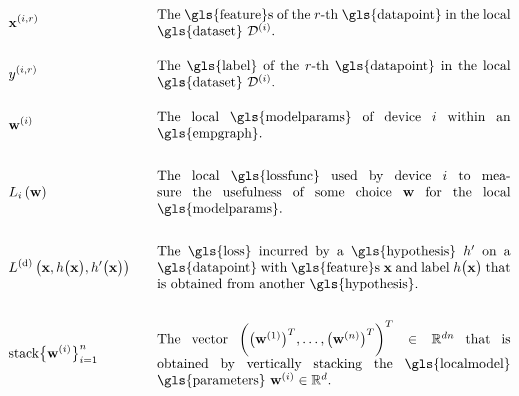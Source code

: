 \begin{align} 
		&\featurevec^{(\nodeidx,\sampleidx)} & \quad & \parbox{.75\textwidth}{The \gls{feature}s of the $\sampleidx$-th \gls{datapoint} in 
		the local \gls{dataset} $\localdataset{\nodeidx}$.}  \nonumber   \\[4mm] 
	&\truelabel^{(\nodeidx,\sampleidx)} & \quad & \parbox{.75\textwidth}{The \gls{label} of the $\sampleidx$-th \gls{datapoint} in 
		the local \gls{dataset} $\localdataset{\nodeidx}$.} \nonumber \\[4mm]
		&\localparams{\nodeidx} & \quad & \parbox{.75\textwidth}{The local \gls{modelparams} of device $\nodeidx$ within an \gls{empgraph}.} \nonumber\\[6mm]
		&\locallossfunc{\nodeidx}{\weights} & \quad & \parbox{.75\textwidth}{The local \gls{lossfunc} used by device $\nodeidx$ 
		to measure the usefulness of some choice $\weights$ for the local \gls{modelparams}.} \nonumber \\[6mm]
	& \gtvloss{\featurevec}{\hypothesis\big(\featurevec\big)}{\hypothesis'\big(\featurevec\big)}& \quad & \parbox{.75\textwidth}{The \gls{loss} 
		incurred by a \gls{hypothesis} $\hypothesis'$ on a \gls{datapoint} with \gls{feature}s $\featurevec$ and label 
		$\hypothesis\big( \featurevec\big)$ that is obtained from another \gls{hypothesis}.} \nonumber \\[6mm]
		& 	{\rm stack} \big\{ \weights^{(\nodeidx)} \big\}_{\nodeidx=1}^{\nrnodes} & \quad & \parbox{.75\textwidth}{The vector $\bigg( \big(\weights^{(1)}  \big)^{T}, \ldots, \big(\weights^{(\nrnodes)}  \big)^{T} \bigg)^{T} \in \mathbb{R}^{\dimlocalmodel\nrnodes}$ that 
			is obtained by vertically stacking the \gls{localmodel} \gls{parameters} $\weights^{(\nodeidx)} \in \mathbb{R}^{\dimlocalmodel}$.} \nonumber  
\end{align}        



